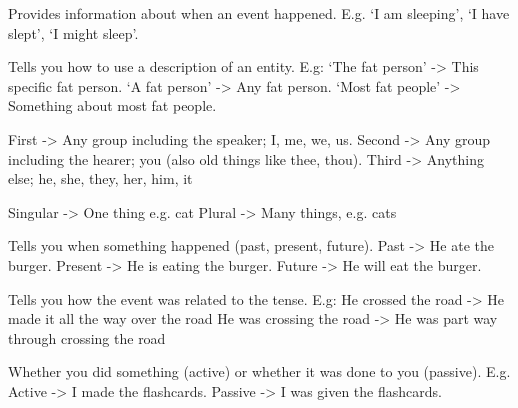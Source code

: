  {
	Provides information about when an event happened.
	\vspace{1em}
	E.g. `I am sleeping', `I have slept', `I might sleep'.
}

 {
	Tells you how to use a description of an entity. E.g:
	\vspace{1em} `The fat person' -> This specific fat person.
	\vspace{1em} `A fat person' -> Any fat person.
	\vspace{1em} `Most fat people' -> Something about most fat people.
}

 {
	First -> Any group including the speaker; I, me, we, us.
	\vspace{1em}
	Second -> Any group including the hearer; you (also old things like thee, thou).
	\vspace{1em}
	Third -> Anything else; he, she, they, her, him, it
}

 {
	Singular -> One thing e.g. cat
	\vspace{1em}
	Plural -> Many things, e.g. cats
}

 {
	Tells you when something happened (past, present, future).
	\vspace{1em} Past -> He ate the burger.
	\vspace{1em} Present -> He is eating the burger.
	\vspace{1em} Future -> He will eat the burger.
}

 {
	Tells you how the event was related to the tense. E.g:
	\vspace{1em} He crossed the road -> He made it all the way over the road
	\vspace{1em} He was crossing the road -> He was part way through crossing the road
}

 {
	Whether you did something (active) or whether it was done to you (passive). E.g.
	\vspace{1em} Active -> I made the flashcards.
	\vspace{1em} Passive -> I was given the flashcards.
}